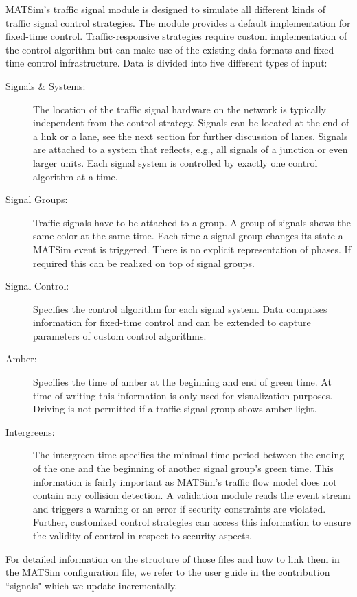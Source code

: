 MATSim's traffic signal module is designed to simulate all different kinds of traffic signal control strategies. 
The module provides a default implementation for fixed-time control. 
Traffic-responsive strategies require custom implementation of the control algorithm but can make use of the existing data formats and fixed-time control infrastructure. 
Data is divided into five different types of input:
\begin{description}
	\item[Signals \& Systems:] The location of the traffic signal hardware on the network is typically independent from the control strategy. 
		Signals can be located at the end of a link or a lane, see the next section for further discussion of lanes. Signals are attached to a system that reflects, e.g., all signals of a junction or even larger units. 
		Each signal system is controlled by exactly one control algorithm at a time.  
	\item[Signal Groups:] Traffic signals have to be attached to a group. 
		A group of signals shows the same color at the same time. 
		Each time a signal group changes its state a MATSim event is triggered. 
		There is no explicit representation of phases. 
		If required this can be realized on top of signal groups.  
	\item[Signal Control:] Specifies the control algorithm for each signal system. 
		Data comprises information for fixed-time control and can be extended to capture parameters of custom control algorithms. 
	\item[Amber:] Specifies the time of amber at the beginning and end of green time. 
		At time of writing this information is only used for visualization purposes. 
		Driving is not permitted if a traffic signal group shows amber light. 
	\item[Intergreens:] The intergreen time specifies the minimal time period between the ending of the one and the beginning of another signal group's green time.  
		This information is fairly important as MATSim's traffic flow model does not contain any collision detection. 
		A validation module reads the event stream and triggers a warning or an error if security constraints are violated. 
		Further, customized control strategies can access this information to ensure the validity of control in respect to security aspects.    
\end{description}

For detailed information on the structure of those files and how to link them in the MATSim configuration file, we refer to the user guide in the contribution ``signals" which we update incrementally.

